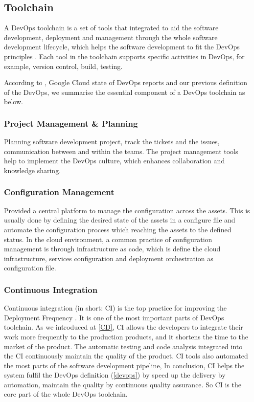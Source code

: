 \subsection{Toolchain}
A DevOps toolchain is a set of tools that integrated to aid the software development, deployment and management through the whole software development lifecycle, which helps the software development to fit the DevOps principles \cite{DevOpsto7:online}\cite{Toolchai10:online}\cite{WhatisaD20:online}. Each tool in the toolchain supports specific activities in DevOps, for example, version control, build, testing.
\par
According to \cite{WhatisaD20:online}, Google Cloud state of DevOps reports \cite{forsgrenaccelerate}\cite{velasquez2014state}\cite{forsgren20192019} and our previous definition of the DevOps, we summarise the essential component of a DevOps toolchain as below.
\subsubsection{Project Management \& Planning}
Planning software development project, track the tickets and the issues, communication between and within the teams. The project management tools help to implement the DevOps culture, which enhances collaboration and knowledge sharing.
\subsubsection{Configuration Management}
Provided a central platform to manage the configuration across the assets. This is usually done by defining the desired state of the assets in a configure file and automate the configuration process which reaching the assets to the defined status. In the cloud environment, a common practice of configuration management is through infrastructure as code, which is define the cloud infrastructure, services configuration and deployment orchestration as configuration file\cite{7965401}.
\subsubsection{Continuous Integration}
Continuous integration (in short: CI) is the top practice for improving the Deployment Frequency \cite{velasquez2014state}. It is one of the most important parts of DevOps toolchain. As we introduced at \ref{CD}, CI allows the developers to integrate their work more frequently to the production products, and it shortens the time to the market of the product. The automatic testing and code analysis integrated into the CI continuously maintain the quality of the product. CI tools also automated the most parts of the software development pipeline, In conclusion, CI helps the system fulfil the DevOps definition (\ref{devops}) by speed up the delivery by automation, maintain the quality by continuous quality assurance. So CI is the core part of the whole DevOps toolchain.
